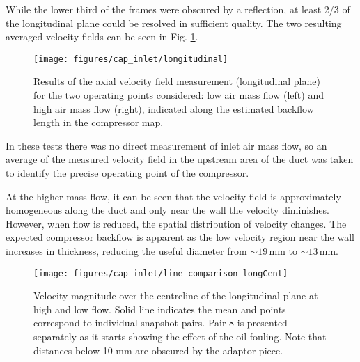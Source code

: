 While the lower third of the frames were obscured by a reflection, at least 2/3 of the longitudinal plane could be resolved in sufficient quality. The two resulting averaged velocity fields can be seen in Fig. \ref{fig:longitudinal}.

\begin{figure}[b!]
\hspace{-0.1\textwidth}
\texttt{[image: figures/cap\_inlet/longitudinal]}
\caption{Results of the axial velocity field measurement (longitudinal plane) for the two operating points considered: low air mass flow (left) and high air mass flow (right), indicated along the estimated backflow length in the compressor map.}
\label{fig:longitudinal}
\end{figure}

In these tests there was no direct measurement of inlet air mass flow, so an average of the measured velocity field in the upstream area of the duct was taken to identify the precise operating point of the compressor.

At the higher mass flow, it can be seen that the velocity field is approximately homogeneous along the duct and only near the wall the velocity diminishes. However, when flow is reduced, the spatial distribution of velocity changes. The expected compressor backflow is apparent as the low velocity region near the wall increases in thickness, reducing the useful diameter from $\sim 19\,$mm to $\sim 13\,$mm. 

\begin{figure}[t!]
\centering
\texttt{[image: figures/cap\_inlet/line\_comparison\_longCent]}
\caption{Velocity magnitude over the centreline of the longitudinal plane at high and low flow. Solid line indicates the mean and points correspond to individual snapshot pairs. Pair 8 is presented separately as it starts showing the effect of the oil fouling. Note that distances below 10 mm are obscured by the adaptor piece.}
\label{fig:line_comp_long}
\end{figure} 


